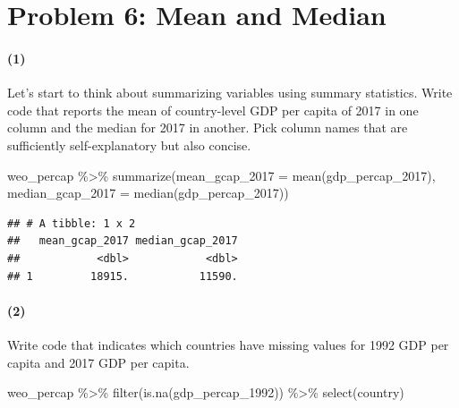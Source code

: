 \documentclass[11pt]{article}
\newenvironment{Shaded}{\begin{snugshade}}{\end{snugshade}}
\newcommand{\AttributeTok}[1]{\textcolor[rgb]{0.77,0.63,0.00}{#1}}
\newcommand{\FunctionTok}[1]{\textcolor[rgb]{0.00,0.00,0.00}{#1}}
\newcommand{\NormalTok}[1]{#1}
\newcommand{\SpecialCharTok}[1]{\textcolor[rgb]{0.00,0.00,0.00}{#1}}
\begin{document}
\hypertarget{problem-6-mean-and-median}{%
\section*{Problem 6: Mean and Median}\label{problem-6-mean-and-median}}

\paragraph{(1)}

Let's start to think about summarizing variables using summary
statistics. Write code that reports the mean of country-level GDP per
capita of 2017 in one column and the median for 2017 in another. Pick
column names that are sufficiently self-explanatory but also concise.

\begin{Shaded}
\begin{Highlighting}[]
\NormalTok{weo\_percap }\SpecialCharTok{\%\textgreater{}\%}
  \FunctionTok{summarize}\NormalTok{(}\AttributeTok{mean\_gcap\_2017 =} \FunctionTok{mean}\NormalTok{(gdp\_percap\_2017),}
            \AttributeTok{median\_gcap\_2017 =} \FunctionTok{median}\NormalTok{(gdp\_percap\_2017))}
\end{Highlighting}
\end{Shaded}

\begin{verbatim}
## # A tibble: 1 x 2
##   mean_gcap_2017 median_gcap_2017
##            <dbl>            <dbl>
## 1         18915.           11590.
\end{verbatim}

\paragraph{(2)}

Write code that indicates which countries have missing values for 1992
GDP per capita and 2017 GDP per capita.

\begin{Shaded}
\begin{Highlighting}[]
\NormalTok{weo\_percap }\SpecialCharTok{\%\textgreater{}\%}
  \FunctionTok{filter}\NormalTok{(}\FunctionTok{is.na}\NormalTok{(gdp\_percap\_1992)) }\SpecialCharTok{\%\textgreater{}\%}
  \FunctionTok{select}\NormalTok{(country)}
\end{Highlighting}
\end{Shaded}
\end{document}
